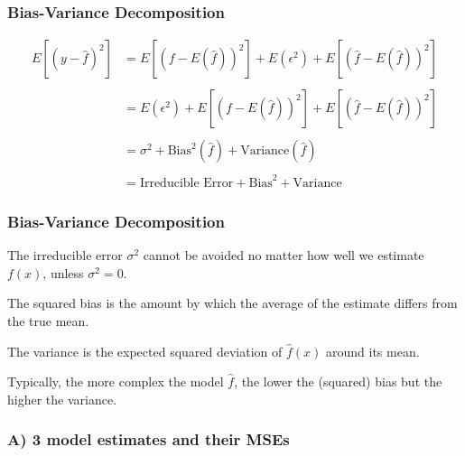 \documentclass[12pt]{beamer}\usepackage[]{graphicx}\usepackage[]{color}
\begin{document}

\begin{frame}
\frametitle{Bias-Variance Decomposition}

\begin{align*}
E [(y - \hat{f})^2] &= E \left [(f - E(\hat{f}))^2 \right ] + E(\epsilon^2) +
E \left [(\hat{f} - E(\hat{f}))^2 \right ] \\
& \\
&= E(\epsilon^2) + E \left [(f - E(\hat{f}))^2 \right ] +
E \left [(\hat{f} - E(\hat{f}))^2 \right ] \\
& \\
&= \sigma^2 + \text{Bias}^2(\hat{f}) + \text{Variance}(\hat{f}) \\
& \\
&= \text{Irreducible Error} + \text{Bias}^2 + \text{Variance}
\end{align*}

\end{frame}


\begin{frame}
\frametitle{Bias-Variance Decomposition}

\bbi
  \item The irreducible error $\sigma^2$ cannot be avoided no matter how well we
  estimate $f(x)$, unless $\sigma^2 = 0$.
  \item The squared bias is the amount by which the average of the estimate differs 
  from the true mean.
  \item The variance is the expected squared deviation of $\hat{f}(x)$ around its mean.
  \item Typically, the more complex the model $\hat{f}$, the lower the (squared) bias 
  but the higher the variance. 
\ei

\end{frame}


\begin{frame}
\begin{center}
\Large{}
\end{center}
\end{frame}


\begin{frame}
\frametitle{A) 3 model estimates and their MSEs}
\begin{center}
\end{center}
\end{frame}
\end{document}
